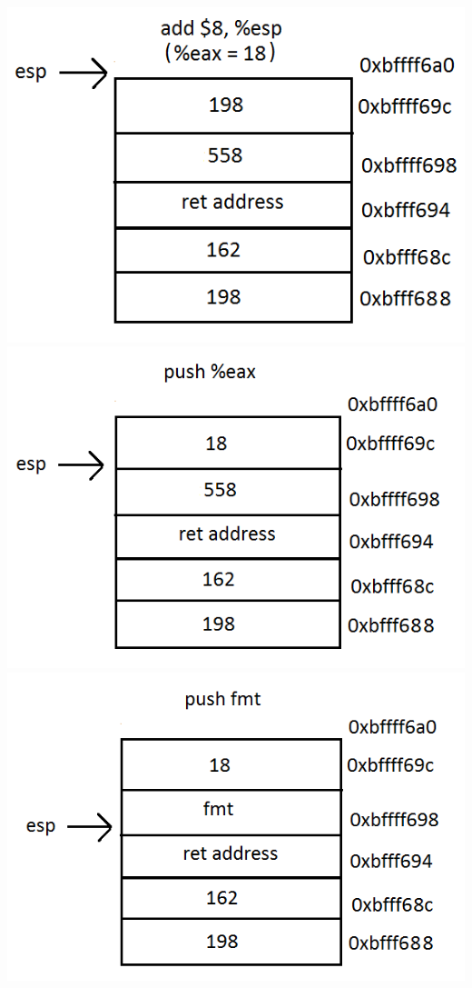 \documentclass{article}
\begin{document}
\includegraphics[scale=0.5]{stack10.png}\\
\includegraphics[scale=0.5]{stack11.png} 
\includegraphics[scale=0.5]{stack12.png}\\
\end{document}

